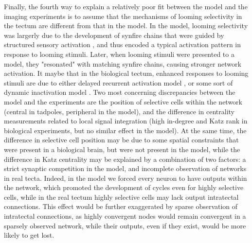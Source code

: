 \documentclass{article}
\begin{document}
Finally, the fourth way to explain a relatively poor fit between the model and the imaging experiments is to assume that the mechanisms of looming selectivity in the tectum are different from that in the model. In the model, looming selectivity was largerly due to the development of synfire chains \citep{zheng2014synfire,cohen2002synreview} that were guided by structured sensory activation \citep{clopath2010stdpcoding}, and thus encoded a typical activation pattern in response to looming stimuli. Later, when looming stimuli were presented to a model, they "resonated" with matching synfire chains, causing stronger network activation. It maybe that in the biological tectum, enhanced responses to looming stimuli are due to either delayed recurrent activation model \citep{khakhalin2014,jang2016}, or some sort of dynamic inactivation model \citep{fotowat2011multiplexing}. Two most concerning discrepancies between the model and the experiments are  the position of selective cells within the network (central in tadpoles, peripheral in the model), and the difference in centrality measurements related to local signal integration (high in-degree and Katz rank in biological experiments, but no similar effect in the model). At the same time, the difference in selective cell position may be due to some spatial constraints that were present in a biological brain, but were not present in the model, while the difference in Katz centrality may be explained by a combination of two factors: a strict synaptic competition in the model, and incomplete observation of networks in real tecta. Indeed, in the model we forced every neuron to have outputs within the network, which promoted the development of cycles even for highly selective cells, while in the real tectum highly selective cells may lack output intratectal connections. This effect would be further exaggerated by sparse observation of intratectal connections, as highly convergent nodes would remain convergent in a sparsely observed network, while their outputs, even if they exist, would be more likely to get lost.
\end{document}
